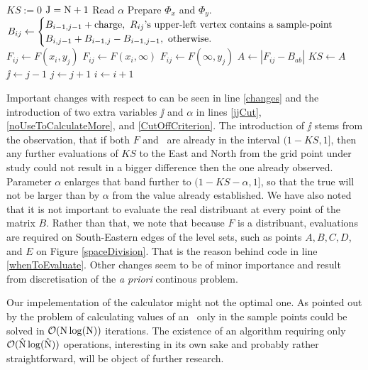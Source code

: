 \begin{Algo}[2D-ECDF]
	\
	\begin{algorithmic}[1]
		\State $KS := 0$ 
		\State $\mathrm{J} = \mathrm{N}+1$
	 	\State Read $\alpha$
		\State Prepare $\Phi_x$ and $\Phi_y$. 	
			\label{jjCut}
				\State \,$B_{ij} \gets 
				\begin{cases} 
					B_{i-1,j-1} + \text{charge}, \text{ $R_{ij}$'s upper-left vertex contains a sample-point} \cr
					B_{i,j-1} + B_{i-1,j} -  B_{i-1,j-1}, \text{ otherwise.} 
				\end{cases}$
					\State $F_{ij} \gets F(x_i, y_j)$\label{whenToEvaluate}
					\State $F_{ij} \gets F(x_i,\infty)$
					\State $F_{ij} \gets F(\infty, y_j)$
				\EndIf
					\State $A \gets |F_{ij} - B_{ab}|$\label{changes}
						\State $KS \gets A$
					\EndIf
					\label{CutOffCriterion}
						\State $\jj \gets j-1$\label{noUseToCalculateMore}
					\EndIf
				\EndFor
				\State $j \gets j+1$
			\EndWhile
			\State $i \gets i+1$
		\EndWhile
	\end{algorithmic}
\end{Algo}



Important changes with respect to \cite{NiVingron} can be seen in line \ref{changes} and the introduction of two extra variables $\jj$ and $\alpha$ in lines \ref{jjCut}, \ref{noUseToCalculateMore}, and \ref{CutOffCriterion}. The introduction of $\jj$ stems from the observation, that if both $F$ and \Fecdf\, are already in the interval $(1-KS,1]$, then any further evaluations of $KS$ to the East and North from the grid point under study could not result in a bigger difference then the one already observed. Parameter $\alpha$ enlarges that band further to $(1-KS-\alpha,1]$, so that the true \KS will not be larger than by $\alpha$ from the value already established. We have also noted that it is not important to evaluate the real distribuant at every point of the matrix $B$. Rather than that, we note that because $F$ is a distribuant, evaluations are required on South-Eastern edges of the level sets, such as points $A, B, C, D$, and $E$ on Figure \ref{spaceDivision}. That is the reason behind code in line \ref{whenToEvaluate}. Other changes seem to be of minor importance and result from discretisation of the {\it a priori} continous problem. 


Our impelementation of the \KS calculator might not the optimal one. As pointed out by \citet*{Jon} the problem of calculating values of an \ecdf\, only in the sample points could be solved in $\mathcal{O}(\mathrm{N} \log( \mathrm{N} ))$ iterations. The existence of an algorithm requiring only $\mathcal{O}(\hat{\mathrm{N}} \log( \hat{\mathrm{N}}  ))$ operations, interesting in its own sake and probably rather straightforward, will be object of further research.
